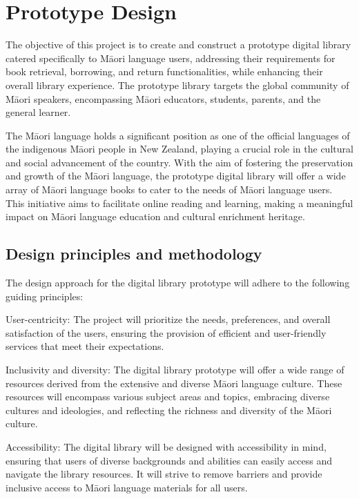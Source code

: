 \section{Prototype Design}

The objective of this project is to create and construct a prototype digital library catered specifically to Māori language users, addressing their requirements for book retrieval, borrowing, and return functionalities, while enhancing their overall library experience. The prototype library targets the global community of Māori speakers, encompassing Māori educators, students, parents, and the general learner.

The Māori language holds a significant position as one of the official languages of the indigenous Māori people in New Zealand, playing a crucial role in the cultural and social advancement of the country. With the aim of fostering the preservation and growth of the Māori language, the prototype digital library will offer a wide array of Māori language books to cater to the needs of Māori language users. This initiative aims to facilitate online reading and learning, making a meaningful impact on Māori language education and cultural enrichment heritage\cite{Discover30:online}.

\subsection{Design principles and methodology}

The design approach for the digital library prototype will adhere to the following guiding principles:

User-centricity: The project will prioritize the needs, preferences, and overall satisfaction of the users, ensuring the provision of efficient and user-friendly services that meet their expectations.

Inclusivity and diversity: The digital library prototype will offer a wide range of resources derived from the extensive and diverse Māori language culture. These resources will encompass various subject areas and topics, embracing diverse cultures and ideologies, and reflecting the richness and diversity of the Māori culture.

Accessibility: The digital library will be designed with accessibility in mind, ensuring that users of diverse backgrounds and abilities can easily access and navigate the library resources. It will strive to remove barriers and provide inclusive access to Māori language materials for all users.

